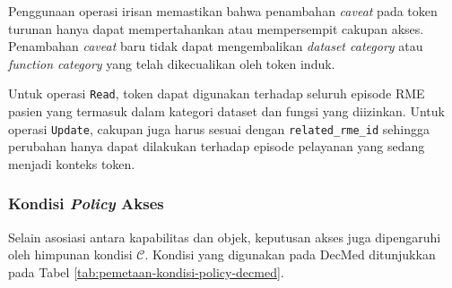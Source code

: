 \documentclass[bahasa, 12pt, a4paper, onecolumn, oneside, final]{report}
\begin{document}
Penggunaan operasi irisan memastikan bahwa penambahan \textit{caveat} pada token turunan hanya dapat mempertahankan atau mempersempit cakupan akses. Penambahan \textit{caveat} baru tidak dapat mengembalikan \textit{dataset category} atau \textit{function category} yang telah dikecualikan oleh token induk.

Untuk operasi \texttt{Read}, token dapat digunakan terhadap seluruh episode RME pasien yang termasuk dalam kategori dataset dan fungsi yang diizinkan. Untuk operasi \texttt{Update}, cakupan juga harus sesuai dengan \texttt{related\_rme\_id} sehingga perubahan hanya dapat dilakukan terhadap episode pelayanan yang sedang menjadi konteks token.

\subsubsection{Kondisi \textit{Policy} Akses}

Selain asosiasi antara kapabilitas dan objek, keputusan akses juga dipengaruhi oleh himpunan kondisi $\mathcal{C}$. Kondisi yang digunakan pada DecMed ditunjukkan pada Tabel \ref{tab:pemetaan-kondisi-policy-decmed}.
\end{document}
